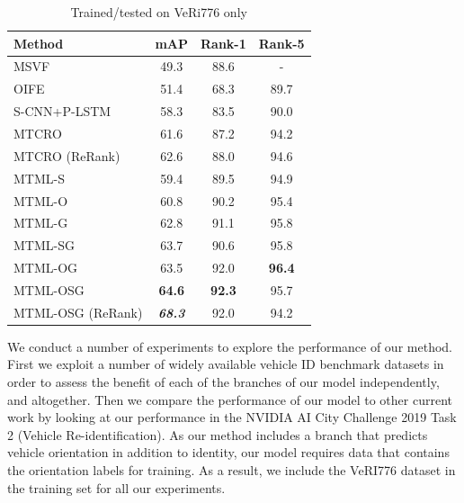 \documentclass[10pt,twocolumn,letterpaper]{article}
\begin{document}
\begin{table}[h]
  \centering
  \begin{tabular}{l || c | c | c }
    \hline
    Method & mAP & Rank-1 & Rank-5 \\
    \hline
    MSVF \cite{kanaci2018vehicle} & 49.3 & 88.6 & - \\
    OIFE \cite{wang2017orientation} & 51.4 & 68.3 & 89.7 \\
    S-CNN+P-LSTM \cite{Shen_2017_ICCV} & 58.3 & 83.5 & 90.0 \\
    MTCRO \cite{xu2018framework} & 61.6 & 87.2 & 94.2 \\
    MTCRO (ReRank) \cite{xu2018framework} & 62.6 & 88.0 & 94.6 \\
    \hline
    MTML-S & 59.4 & 89.5 & 94.9 \\
    MTML-O & 60.8 & 90.2 & 95.4 \\
    MTML-G & 62.8 & 91.1 & 95.8 \\
    \hline
    MTML-SG & 63.7 & 90.6 & 95.8 \\
    MTML-OG & 63.5 & 92.0 & \bf{96.4}\\
    MTML-OSG & \bf{64.6} & \bf{92.3} & 95.7 \\
    MTML-OSG (ReRank) & \bf{\emph{68.3}} & 92.0 & 94.2 \\
    \hline
  \end{tabular}
  \caption{Trained/tested on VeRi776 only}
  \label{T:benchmark_results_veri}
\end{table}

We conduct a number of experiments to explore the performance of our method. First we exploit a number of widely available vehicle ID benchmark datasets in order to assess the benefit of each of the branches of our model independently, and altogether. Then we compare the performance of our model to other current work by looking at our performance in the NVIDIA AI City Challenge 2019 Task 2 (Vehicle Re-identification). As our method includes a branch that predicts vehicle orientation in addition to identity, our model requires data that contains the orientation labels for training. As a result, we include the VeRI776 \cite{liu2016veri} dataset in the training set for all our experiments.
\end{document}
